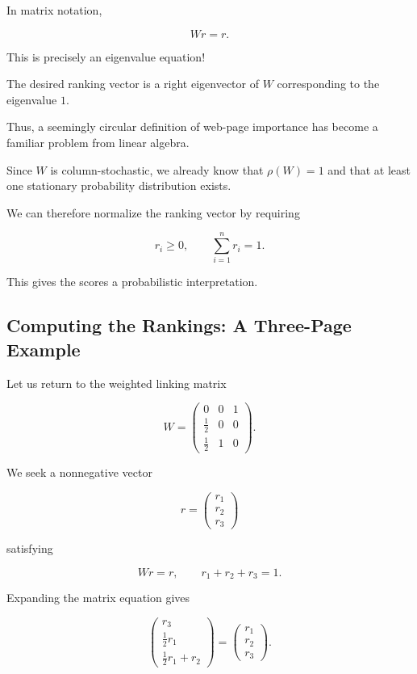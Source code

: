 \documentclass[11pt,a4paper]{article}
\theoremstyle{definition}
\theoremstyle{remark}
\begin{document}
In matrix notation,

\begin{equation}
\boxed{
Wr=r.
}
\label{eq:pagerank_eigenvector_equation}
\end{equation}

This is precisely
an eigenvalue equation!

The desired ranking vector
is a right eigenvector
of $W$ corresponding
to the eigenvalue $1$.

Thus, a seemingly circular
definition of web-page
importance has become
a familiar problem
from linear algebra.

Since $W$ is column-stochastic,
we already know that
$\rho(W)=1$ and that
at least one stationary
probability distribution exists.

We can therefore normalize
the ranking vector by requiring

\[
r_i\geq0,
\qquad
\sum_{i=1}^{n}r_i=1.
\]

This gives the scores
a probabilistic interpretation.


\subsection{Computing the Rankings:
A Three-Page Example}

Let us return to
the weighted linking matrix

\[
W=
\begin{pmatrix}
0&0&1\\
\frac12&0&0\\
\frac12&1&0
\end{pmatrix}.
\]

We seek a nonnegative vector

\[
r=
\begin{pmatrix}
r_1\\
r_2\\
r_3
\end{pmatrix}
\]

satisfying

\[
Wr=r,
\qquad
r_1+r_2+r_3=1.
\]

Expanding the matrix
equation gives

\[
\begin{pmatrix}
r_3\\
\frac12r_1\\
\frac12r_1+r_2
\end{pmatrix}
=
\begin{pmatrix}
r_1\\
r_2\\
r_3
\end{pmatrix}.
\]
\end{document}
